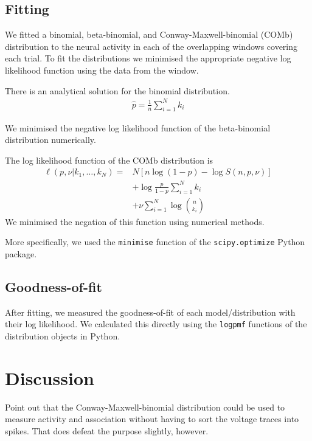 \documentclass[a4paper,12pt]{article}
\theoremstyle{definition}
\begin{document}
      \newpage

    \subsection{Fitting}
    We fitted a binomial, beta-binomial, and Conway-Maxwell-binomial (COMb) distribution to the neural activity in each of the overlapping windows covering each trial. To fit the distributions we minimised the appropriate negative log likelihood function using the data from the window.

    There is an analytical solution for the binomial distribution.
    \begin{align}\label{eq:binomial_log_like_p_estimate}
      \hat{p} = \frac{1}{n}\sum_{i=1}^N k_i
    \end{align}

    We minimised the negative log likelihood function of the beta-binomial distribution numerically.

    The log likelihood function of the COMb distribution is
    \begin{align}\label{eq:comb_log_like}
      \ell (p,\nu | k_1,\dots,k_N) =& N\left[n\log(1-p) - \log S(n,p,\nu)\right]  \\
        &+ \log \frac{p}{1-p} \sum_{i=1}^N k_i \\
        &+ \nu \sum_{i=1}^N \log \binom{n}{k_i}
    \end{align}
    We minimised the negation of this function using numerical methods.

    More specifically, we used the \texttt{minimise} function of the \texttt{scipy.optimize} Python package.

    \subsection{Goodness-of-fit}
    After fitting, we measured the goodness-of-fit of each model/distribution with their log likelihood. We calculated this directly using the \texttt{logpmf} functions of the distribution objects in Python.

\section{Discussion}
Point out that the Conway-Maxwell-binomial distribution could be used to measure activity and association without having to sort the voltage traces into spikes. That does defeat the purpose slightly, however.

\newpage

\end{document}
